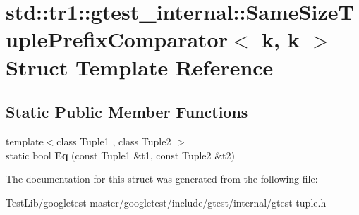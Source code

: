 \hypertarget{structstd_1_1tr1_1_1gtest__internal_1_1SameSizeTuplePrefixComparator_3_01k_00_01k_01_4}{}\section{std\+:\+:tr1\+:\+:gtest\+\_\+internal\+:\+:Same\+Size\+Tuple\+Prefix\+Comparator$<$ k, k $>$ Struct Template Reference}
\label{structstd_1_1tr1_1_1gtest__internal_1_1SameSizeTuplePrefixComparator_3_01k_00_01k_01_4}
\subsection*{Static Public Member Functions}
\begin{DoxyCompactItemize}
\item 
\mbox{\label{structstd_1_1tr1_1_1gtest__internal_1_1SameSizeTuplePrefixComparator_3_01k_00_01k_01_4_a5564fbade05a2d0522d9899da62c2119}} 
{\footnotesize template$<$class Tuple1 , class Tuple2 $>$ }\\static bool {\bfseries Eq} (const Tuple1 \&t1, const Tuple2 \&t2)
\end{DoxyCompactItemize}


The documentation for this struct was generated from the following file\+:\begin{DoxyCompactItemize}
\item 
Test\+Lib/googletest-\/master/googletest/include/gtest/internal/gtest-\/tuple.\+h\end{DoxyCompactItemize}
